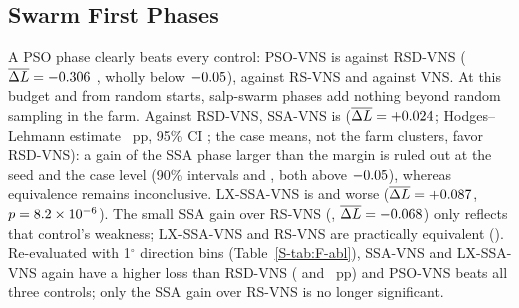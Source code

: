\subsection{Swarm First Phases}
\label{sec:abl-swarm}
A PSO phase clearly beats every control: PSO-VNS is \NAblPSOVNSvsRSDVNS{} against RSD-VNS ($\overline{\Delta L}=-0.306$ \NEqPSOVNSvsRSDVNSCI, wholly below $-0.05$), \NAblPSOVNSvsRSVNS{} against RS-VNS and \NAblPSOVNSvsVNS{} against VNS. At this budget and from random starts, salp-swarm phases add nothing beyond random sampling in the farm. Against RSD-VNS, SSA-VNS is \NAblSSAVNSvsRSDVNS{} ($\overline{\Delta L}=+0.024$; Hodges--Lehmann estimate \NXHLSSAVNSvsRSDVNS~pp, 95\% CI \NXHLSSAVNSvsRSDVNSCI; the case means, not the farm clusters, favor RSD-VNS): a gain of the SSA phase larger than the margin is ruled out at the seed and the case level (90\% intervals \NXEqSeedSSAVNSvsRSDVNSCI{} and \NXEqCaseSSAVNSvsRSDVNSCI, both above $-0.05$), whereas equivalence remains inconclusive. LX-SSA-VNS is \NAblLXSSAVNSvsRSDVNS{} and worse ($\overline{\Delta L}=+0.087$, $p=8.2\times10^{-6}$). The small SSA gain over RS-VNS (\NAblSSAVNSvsRSVNS, $\overline{\Delta L}=-0.068$) only reflects that control's weakness; LX-SSA-VNS and RS-VNS are practically equivalent (\NEqLXSSAVNSvsRSVNSCI). Re-evaluated with 1$^\circ$ direction bins (Table~\ref{S-tab:F-abl}), SSA-VNS and LX-SSA-VNS again have a higher loss than RSD-VNS (\NFAblSSAVNSvsRSDVNSOne{} and \NFAblLXSSAVNSvsRSDVNSOne~pp) and PSO-VNS beats all three controls; only the SSA gain over RS-VNS is no longer significant.

